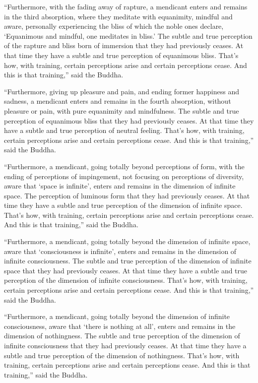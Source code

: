 \documentclass[12pt,openany]{book}%
\begin{document}
“Furthermore, with the fading away of rapture, a mendicant enters and remains in the third absorption, where they meditate with equanimity, mindful and aware, personally experiencing the bliss of which the noble ones declare, ‘Equanimous and mindful, one meditates in bliss.’ The subtle and true perception of the rapture and bliss born of immersion that they had previously ceases. At that time they have a subtle and true perception of equanimous bliss. That’s how, with training, certain perceptions arise and certain perceptions cease. And this is that training,” said the Buddha. 

“Furthermore, giving up pleasure and pain, and ending former happiness and sadness, a mendicant enters and remains in the fourth absorption, without pleasure or pain, with pure equanimity and mindfulness. The subtle and true perception of equanimous bliss that they had previously ceases. At that time they have a subtle and true perception of neutral feeling. That’s how, with training, certain perceptions arise and certain perceptions cease. And this is that training,” said the Buddha. 

“Furthermore, a mendicant, going totally beyond perceptions of form, with the ending of perceptions of impingement, not focusing on perceptions of diversity, aware that ‘space is infinite’, enters and remains in the dimension of infinite space. The perception of luminous form that they had previously ceases. At that time they have a subtle and true perception of the dimension of infinite space. That’s how, with training, certain perceptions arise and certain perceptions cease. And this is that training,” said the Buddha. 

“Furthermore, a mendicant, going totally beyond the dimension of infinite space, aware that ‘consciousness is infinite’, enters and remains in the dimension of infinite consciousness. The subtle and true perception of the dimension of infinite space that they had previously ceases. At that time they have a subtle and true perception of the dimension of infinite consciousness. That’s how, with training, certain perceptions arise and certain perceptions cease. And this is that training,” said the Buddha. 

“Furthermore, a mendicant, going totally beyond the dimension of infinite consciousness, aware that ‘there is nothing at all’, enters and remains in the dimension of nothingness. The subtle and true perception of the dimension of infinite consciousness that they had previously ceases. At that time they have a subtle and true perception of the dimension of nothingness. That’s how, with training, certain perceptions arise and certain perceptions cease. And this is that training,” said the Buddha. 
\end{document}
